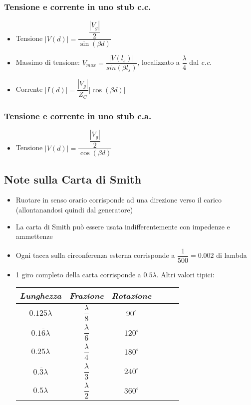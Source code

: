 \documentclass{article}
\begin{document}
\subsubsection{Tensione e corrente in uno stub c.c.}
\begin{itemize}
		\item Tensione \( |V(d)| = \dfrac{\dfrac{|V_g|}{2}}{\sin(\beta d)} \)
		\item Massimo di tensione: \( V_{max} = \dfrac{|V(l_s)|}{sin(\beta l_s)} \), localizzato a \( \dfrac{\lambda}{4} \) dal \textit{c.c.}
		\item Corrente \( |I(d)| = \dfrac{|V_g|}{Z_C} |\cos (\beta d) |\)
\end{itemize}

\subsubsection{Tensione e corrente in uno stub c.a.}
\begin{itemize}
	\item Tensione \( |V(d)| = \dfrac{\dfrac{|V_g|}{2}}{\cos(\beta d)} \)
\end{itemize}


\subsection{Note sulla Carta di Smith}
\begin{itemize}
	\item Ruotare in senso orario corrisponde ad una direzione verso il carico (allontanandosi quindi dal generatore)
	\item La carta di Smith può essere usata indifferentemente con impedenze e ammettenze
	\item Ogni tacca sulla circonferenza esterna corrisponde a \( \dfrac{1}{500} = 0.002 \) di lambda
	\item 1 giro completo della carta corrisponde a \(0.5 \lambda\). Altri valori tipici:
	\vspace{5pt}
	\begin{center}
		\begin{tabular}{|Sc|Sc|Sc|}
			\hline 
			\textit{Lunghezza} & \textit{Frazione} & \textit{Rotazione} \\ 
			\hline 	
			\(0.125 \lambda\) & \(\dfrac{\lambda}{8}\) & \(90^\circ\) \\ 
			\hline 
			\(0.1\overline{6} \lambda\) & \(\dfrac{\lambda}{6}\) & \(120^\circ\) \\ 
			\hline 
			\(0.25 \lambda\) & \(\dfrac{\lambda}{4}\) & \(180^\circ\) \\ 
			\hline 
			\(0.\overline{3} \lambda\) & \(\dfrac{\lambda}{3}\) &\(240^\circ\) \\
			\hline
			\(0.5 \lambda\) & \(\dfrac{\lambda}{2}\) & \(360^\circ\) \\ 
			\hline 
		\end{tabular} 
	\end{center}
	\vspace{5pt}
\end{itemize}
\end{document}
